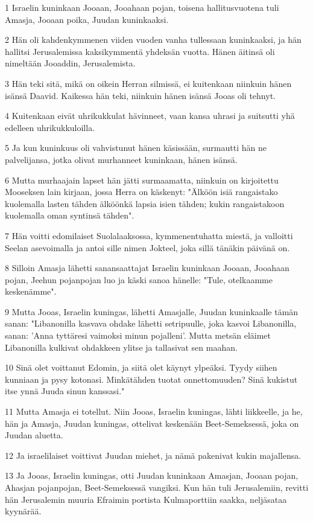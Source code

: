 \par 1 Israelin kuninkaan Jooaan, Jooahaan pojan, toisena hallitusvuotena tuli Amasja, Jooaan poika, Juudan kuninkaaksi.
\par 2 Hän oli kahdenkymmenen viiden vuoden vanha tullessaan kuninkaaksi, ja hän hallitsi Jerusalemissa kaksikymmentä yhdeksän vuotta. Hänen äitinsä oli nimeltään Jooaddin, Jerusalemista.
\par 3 Hän teki sitä, mikä on oikein Herran silmissä, ei kuitenkaan niinkuin hänen isänsä Daavid. Kaikessa hän teki, niinkuin hänen isänsä Jooas oli tehnyt.
\par 4 Kuitenkaan eivät uhrikukkulat hävinneet, vaan kansa uhrasi ja suitsutti yhä edelleen uhrikukkuloilla.
\par 5 Ja kun kuninkuus oli vahvistunut hänen käsissään, surmautti hän ne palvelijansa, jotka olivat murhanneet kuninkaan, hänen isänsä.
\par 6 Mutta murhaajain lapset hän jätti surmaamatta, niinkuin on kirjoitettu Mooseksen lain kirjaan, jossa Herra on käskenyt: "Älköön isiä rangaistako kuolemalla lasten tähden älköönkä lapsia isien tähden; kukin rangaistakoon kuolemalla oman syntinsä tähden".
\par 7 Hän voitti edomilaiset Suolalaaksossa, kymmenentuhatta miestä, ja valloitti Seelan asevoimalla ja antoi sille nimen Jokteel, joka sillä tänäkin päivänä on.
\par 8 Silloin Amasja lähetti sanansaattajat Israelin kuninkaan Jooaan, Jooahaan pojan, Jeehun pojanpojan luo ja käski sanoa hänelle: "Tule, otelkaamme keskenämme".
\par 9 Mutta Jooas, Israelin kuningas, lähetti Amasjalle, Juudan kuninkaalle tämän sanan: "Libanonilla kasvava ohdake lähetti setripuulle, joka kasvoi Libanonilla, sanan: 'Anna tyttäresi vaimoksi minun pojalleni'. Mutta metsän eläimet Libanonilla kulkivat ohdakkeen ylitse ja tallasivat sen maahan.
\par 10 Sinä olet voittanut Edomin, ja siitä olet käynyt ylpeäksi. Tyydy siihen kunniaan ja pysy kotonasi. Minkätähden tuotat onnettomuuden? Sinä kukistut itse ynnä Juuda sinun kanssasi."
\par 11 Mutta Amasja ei totellut. Niin Jooas, Israelin kuningas, lähti liikkeelle, ja he, hän ja Amasja, Juudan kuningas, ottelivat keskenään Beet-Semeksessä, joka on Juudan aluetta.
\par 12 Ja israelilaiset voittivat Juudan miehet, ja nämä pakenivat kukin majallensa.
\par 13 Ja Jooas, Israelin kuningas, otti Juudan kuninkaan Amasjan, Jooaan pojan, Ahasjan pojanpojan, Beet-Semeksessä vangiksi. Kun hän tuli Jerusalemiin, revitti hän Jerusalemin muuria Efraimin portista Kulmaporttiin saakka, neljäsataa kyynärää.
